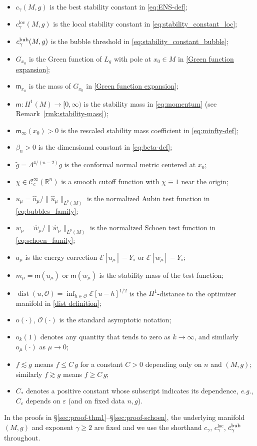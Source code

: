 \documentclass[reqno,11pt]{amsart}
\numberwithin{equation}{section}
\theoremstyle{definition}
\theoremstyle{remark}
\newcommand{\loc}{\mathrm{loc}}
\DeclareMathOperator{\dist}{dist}
\newcommand{\R}{\mathbb{R}}
\newcommand{\eps}{\varepsilon}
\begin{document}
\begin{itemize}[leftmargin=2em, itemsep=2pt]
\item[--] $c_\gamma(M,g)$ is the best stability constant in \eqref{eq:ENS-def};
\item[--] $c_\gamma^{\loc}(M,g)$ is the local stability constant in \eqref{eq:stability_constant_loc};
\item[--] $c_\gamma^{\rm bub}(M,g)$ is the bubble threshold in \eqref{eq:stability_constant_bubble};
\item[--] $G_{x_0}$ is the Green function of $L_g$ with pole at $x_0 \in M$ in \eqref{Green function expansion};
\item[--] $\mathfrak{m}_{x_0}$ is the mass of $G_{x_0}$ in \eqref{Green function expansion};
\item[--] $\mathsf{m}: H^1(M)\to [0,\infty)$ is the stability mass in \eqref{eq:momentum} (see Remark~\ref{rmk:stability-mass});
\item[--] $\mathsf{m}_\infty(x_0)>0$ is the rescaled stability mass coefficient in \eqref{eq:minfty-def};
\item[--] $\beta_n > 0$ is the dimensional constant in \eqref{eq:beta-def};
\item[--] $\tilde{g} = \Lambda^{4/(n-2)} g$ is the conformal normal metric centered at $x_0$;
\item[--] $\chi \in \mathcal{C}^\infty_c(\R^n)$ is a smooth cutoff function with $\chi \equiv 1$ near the origin;
\item[--] $u_\mu = \hat{u}_\mu / \|\hat{u}_\mu\|_{L^p(M)}$ is the normalized Aubin test function in \eqref{eq:bubbles_family};
\item[--] $w_\mu = \hat{w}_\mu / \|\hat{w}_\mu\|_{L^p(M)}$ is the normalized Schoen test function in \eqref{eq:schoen_family};
\item[--] $a_\mu$ is the energy correction $\mathcal{E}[u_\mu] - Y_\circ$ or $\mathcal{E}[w_\mu] - Y_\circ$;
\item[--] $m_\mu = \mathsf{m}(u_\mu)$ or $\mathsf{m}(w_\mu)$ is the stability mass of the test function;
\item[--] $\dist(u, \mathscr{O}) = \inf_{h \in \mathscr{O}} \mathcal{E}[u-h]^{1/2}$ is the $H^1$-distance to the optimizer manifold in \eqref{dist definition};
\item[--] $\mathrm{o}(\cdot)$, $\mathcal{O}(\cdot)$ is the standard asymptotic notation;
\item[--] $\mathrm{o}_k(1)$ denotes any quantity that tends to zero as $k \to \infty$, and similarly $\mathrm{o}_\mu(\cdot)$ as $\mu \to 0$;
\item[--] $f \lesssim g$ means $f \leqslant C\, g$ for a constant $C > 0$ depending only on $n$ and $(M,g)$; similarly $f \gtrsim g$ means $f \geqslant C\, g$;
\item[--] $C_*$ denotes a positive constant whose subscript indicates its dependence, {\it e.g.}, $C_\eps$ depends on $\eps$ (and on fixed data $n, g$).
\end{itemize}
In the proofs in \S\ref{sec:proof-thm1}--\S\ref{sec:proof-schoen}, the underlying manifold $(M,g)$ and exponent $\gamma \geqslant 2$ are fixed and we use the shorthand $c_\gamma$, $c_\gamma^{\loc}$, $c_\gamma^{\rm bub}$ throughout.



\end{document}
